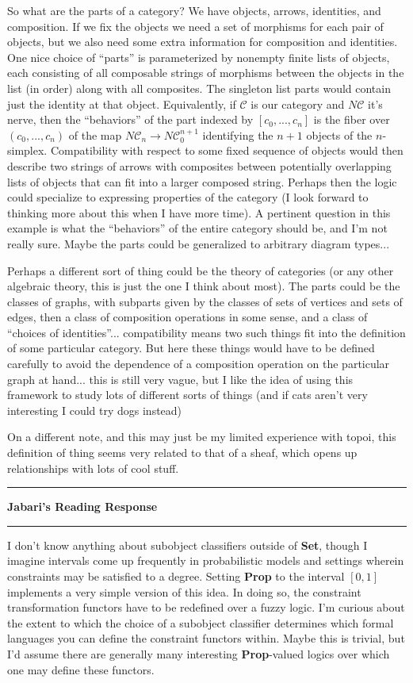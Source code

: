 \documentclass{amsart}
\newcommand{\iam}[1]{
  \vspace{0.25em}
  \hrule
  \vspace{0.25em}
  \textbf{{#1}'s Reading Response}
  \vspace{0.25em}
  \hrule
  \vspace{1em}
}
\begin{document}
So what are the parts of a category? We have objects, arrows, identities, and composition.  If we fix the objects we need a set of morphisms for each pair of objects, but we also need some extra information for composition and identities.  One nice choice of ``parts'' is parameterized by nonempty finite lists of objects, each consisting of all composable strings of morphisms between the objects in the list (in order) along with all composites.  The singleton list parts would contain just the identity at that object. Equivalently, if $\mathcal{C}$ is our category and $N\mathcal{C}$ it's nerve, then the ``behaviors'' of the part indexed by $[c_0,...,c_n]$ is the fiber over $(c_0,...,c_n)$ of the map $N\mathcal{C}_n \to N\mathcal{C}_0^{n+1}$ identifying the $n+1$ objects of the $n$-simplex. Compatibility with respect to some fixed sequence of objects would then describe two strings of arrows with composites between potentially overlapping lists of objects that can fit into a larger composed string.  Perhaps then the logic could specialize to expressing properties of the category (I look forward to thinking more about this when I have more time).  A pertinent question in this example is what the ``behaviors'' of the entire category should be, and I'm not really sure.  Maybe the parts could be generalized to arbitrary diagram types...

Perhaps a different sort of thing could be the theory of categories (or any other algebraic theory, this is just the one I think about most). The parts could be the classes of graphs, with subparts given by the classes of sets of vertices and sets of edges, then a class of composition operations in some sense, and a class of ``choices of identities''... compatibility means two such things fit into the definition of some particular category.  But here these things would have to be defined carefully to avoid the dependence of a composition operation on the particular graph at hand...  this is still very vague, but I like the idea of using this framework to study lots of different sorts of things (and if cats aren't very interesting I could try dogs instead)

On a different note, and this may just be my limited experience with topoi, this definition of thing seems very related to that of a sheaf, which opens up relationships with lots of cool stuff.

\iam{Jabari}
I don't know anything about subobject classifiers outside of \textbf{Set}, though I imagine intervals come up frequently in probabilistic models and settings wherein constraints may be satisfied to a degree. Setting \textbf{Prop} to the interval $[0,1]$ implements a very simple version of this idea. In doing so, the constraint transformation functors have to be redefined over a fuzzy logic. I'm curious about the extent to which the choice of a subobject classifier determines which formal languages you can define the constraint functors within. Maybe this is trivial, but I'd assume there are generally many interesting \textbf{Prop}-valued logics over which one may define these functors.
\end{document}
